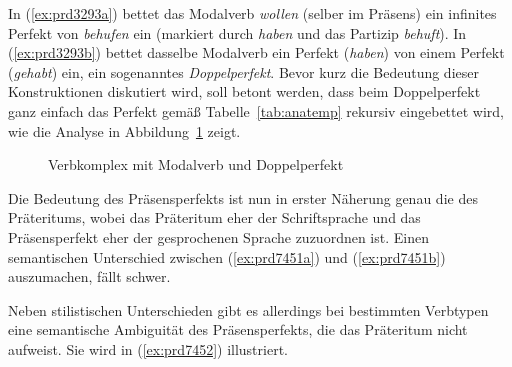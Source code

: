 
In (\ref{ex:prd3293a}) bettet das Modalverb \textit{wollen} (selber im Präsens) ein infinites Perfekt von \textit{behufen} ein (markiert durch \textit{haben} und das Partizip \textit{behuft}).
In (\ref{ex:prd3293b}) bettet dasselbe Modalverb ein Perfekt (\textit{haben}) von einem Perfekt (\textit{gehabt}) ein, ein sogenanntes \textit{Doppelperfekt}.
Bevor kurz die Bedeutung dieser Konstruktionen diskutiert wird, soll betont werden, dass beim Doppelperfekt ganz einfach das Perfekt gemäß Tabelle~\ref{tab:anatemp} rekursiv eingebettet wird, wie die Analyse in Abbildung~\ref{fig:perfektvk} zeigt.

\begin{figure}[!htbp]
  \caption{Verbkomplex mit Modalverb und Doppelperfekt}
  \label{fig:perfektvk}
\end{figure}


Die Bedeutung des Präsensperfekts ist nun in erster Näherung genau die des Präteritums, wobei das Präteritum eher der Schriftsprache und das Präsensperfekt eher der gesprochenen Sprache zuzuordnen ist.
Einen semantischen Unterschied zwischen (\ref{ex:prd7451a}) und (\ref{ex:prd7451b}) auszumachen, fällt schwer.

\begin{exe}
  \ex\label{ex:prd7451} 
  \begin{xlist}
  \end{xlist}
\end{exe}

Neben stilistischen Unterschieden gibt es allerdings bei bestimmten Verbtypen eine semantische Ambiguität des Präsensperfekts, die das Präteritum nicht aufweist.
Sie wird in (\ref{ex:prd7452}) illustriert.

